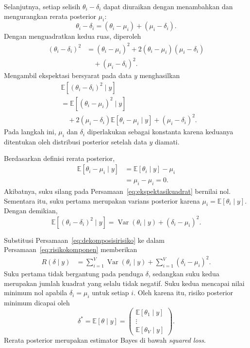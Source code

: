 Selanjutnya, setiap selisih $\theta_i-\delta_i$ dapat diuraikan
dengan menambahkan dan mengurangkan rerata posterior $\mu_i$:
\begin{equation}
\theta_i-\delta_i
=
(\theta_i-\mu_i)+(\mu_i-\delta_i).
\label{eq:uraianselisih}
\end{equation}
Dengan menguadratkan kedua ruas, diperoleh
\begin{align}
(\theta_i-\delta_i)^2
&=
(\theta_i-\mu_i)^2
+2(\theta_i-\mu_i)(\mu_i-\delta_i)
\nonumber\\
&\quad
+(\mu_i-\delta_i)^2.
\label{eq:kuadratselisih}
\end{align}
Mengambil ekspektasi bersyarat pada data $y$ menghasilkan
\begin{align}
&\mathbb{E}\left[
(\theta_i-\delta_i)^2\mid y
\right]
\nonumber\\
&=
\mathbb{E}\left[
(\theta_i-\mu_i)^2\mid y
\right]
\nonumber\\
&\quad+
2(\mu_i-\delta_i)
\mathbb{E}\left[
\theta_i-\mu_i\mid y
\right]
+(\mu_i-\delta_i)^2.
\label{eq:ekspektasikuadrat}
\end{align}
Pada langkah ini, $\mu_i$ dan $\delta_i$ diperlakukan sebagai
konstanta karena keduanya ditentukan oleh distribusi posterior
setelah data $y$ diamati.

Berdasarkan definisi rerata posterior,
\begin{align}
\mathbb{E}\left[
\theta_i-\mu_i\mid y
\right]
&=
\mathbb{E}[\theta_i\mid y]-\mu_i
\nonumber\\
&=\mu_i-\mu_i=0.
\label{eq:rerataterpusat}
\end{align}
Akibatnya, suku silang pada
Persamaan~\eqref{eq:ekspektasikuadrat} bernilai nol.
Sementara itu, suku pertama merupakan varians posterior karena
$\mu_i=\mathbb{E}[\theta_i\mid y]$. Dengan demikian,
\begin{equation}
\mathbb{E}\left[
(\theta_i-\delta_i)^2\mid y
\right]
=
\operatorname{Var}(\theta_i\mid y)
+(\delta_i-\mu_i)^2.
\label{eq:dekomposisirisiko}
\end{equation}

Substitusi Persamaan~\eqref{eq:dekomposisirisiko} ke dalam
Persamaan~\eqref{eq:risikokomponen} memberikan
\begin{align}
R(\delta\mid y)
&=
\sum_{i=1}^{V}
\operatorname{Var}(\theta_i\mid y)
+
\sum_{i=1}^{V}(\delta_i-\mu_i)^2.
\label{eq:risikoterurai}
\end{align}
Suku pertama tidak bergantung pada penduga $\delta$, sedangkan
suku kedua merupakan jumlah kuadrat yang selalu tidak negatif.
Suku kedua mencapai nilai minimum nol apabila
$\delta_i=\mu_i$ untuk setiap $i$. Oleh karena itu, risiko
posterior minimum dicapai oleh
\begin{equation}
\delta^*
=
\mathbb{E}[\theta\mid y]
=
\begin{pmatrix}
\mathbb{E}[\theta_1\mid y]\\
\vdots\\
\mathbb{E}[\theta_V\mid y]
\end{pmatrix}.
\label{eq:estimatorbayes}
\end{equation}
Rerata posterior merupakan estimator Bayes
di bawah \textit{squared loss}.

